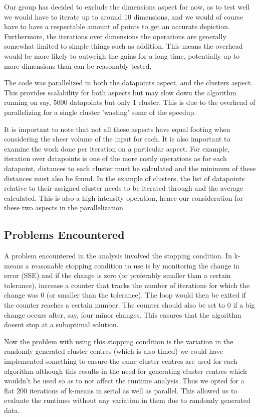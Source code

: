 \documentclass{article}
\begin{document}
Our group has decided to exclude the dimensions aspect for now, as to test well we would have to iterate up to around 10 dimensions, and we would of course have to have a respectable amount of points to get an accurate depiction. Furthermore, the iterations over dimensions the operations are generally somewhat limited to simple things such as addition. This means the overhead would be more likely to outweigh the gains for a long time, potentially up to more dimensions than can be reasonably tested.

The code was parallelized in both the datapoints aspect, and the clusters aspect. This provides scalability for both aspects but may slow down the algorithm running on say, 5000 datapoints but only 1 cluster. This is due to the overhead of parallelizing for a single cluster 'wasting' some of the speedup.

It is important to note that not all these aspects have equal footing when considering the sheer volume of the input for each. It is also important to examine the work done per iteration on a particular aspect. For example, iteration over datapoints is one of the more costly operations as for each datapoint, distances to each cluster must be calculated and the minimum of these distances must also be found. In the example of clusters, the list of datapoints relative to their assigned cluster needs to be iterated through and the average calculated. This is also a high intensity operation, hence our consideration for these two aspects in the parallelization.

\subsection{Problems Encountered}
A problem encountered in the analysis involved the stopping condition. In k-means a reasonable stopping condition to use is by monitoring the change in error (SSE) and if the change is zero (or preferably smaller than a certain tolerance), increase a counter that tracks the number of iterations for which the change was 0 (or smaller than the tolerance). The loop would then be exited if the counter reaches a certain number. The counter should also be set to 0 if a big change occurs after, say, four minor changes. This ensures that the algorithm doesnt stop at a suboptimal solution.

Now the problem with using this stopping condition is the variation in the randomly generated cluster centres (which is also timed) we could have implemented something to ensure the same cluster centres are used for each algorithm although this results in the need for generating cluster centres which wouldn't be used so as to not affect the runtime analysis. Thus we opted for a flat 200 iterations of k-means in serial as well as parallel. This allowed us to evaluate the runtimes without any variation in them due to randomly generated data.
\end{document}
